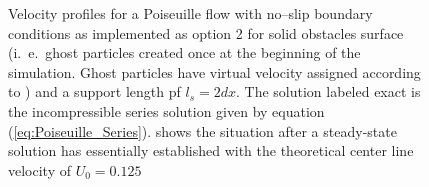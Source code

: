 \documentclass[11pt,a4paper,twoside]{report}
\begin{document}
\begin{figure}[!htbp]
\caption[Velocity profiles Poiseuille flow]{Velocity profiles for a Poiseuille flow with no--slip boundary conditions as implemented as option 2 for solid obstacles surface (i.\ e.\ ghost particles created once at the beginning of the simulation. Ghost particles have virtual velocity assigned according to \cite{Zhu1999} ) and a support length pf $l_s=2dx$. The solution labeled exact is the incompressible series solution given by equation (\ref{eq:Poiseuille_Series}).   shows the situation after a steady-state solution has essentially established with the theoretical center line velocity of $U_0=0.125$}

\end{figure}

\listoffigures
\listoftables



\end{document}
